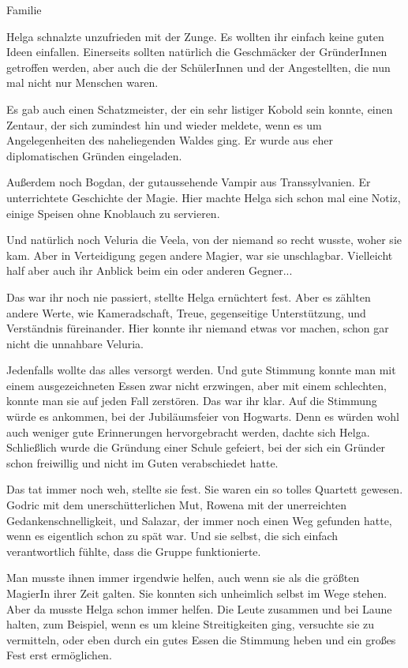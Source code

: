 \documentclass[fontsize=12pt]{scrartcl}
\begin{document}
	{\huge  Familie}
	\vspace{15pt}
	
	{\LARGE H}elga schnalzte unzufrieden mit der Zunge. Es wollten ihr einfach keine guten Ideen einfallen. Einerseits sollten natürlich die Geschmäcker der GründerInnen getroffen werden, aber auch die der SchülerInnen und der Angestellten, die nun mal nicht nur Menschen waren. 
	
	Es gab auch einen Schatzmeister, der ein sehr listiger Kobold sein konnte, einen Zentaur, der sich zumindest hin und wieder meldete, wenn es um Angelegenheiten des naheliegenden Waldes ging. Er wurde aus eher diplomatischen Gründen eingeladen. 
	
	Außerdem noch Bogdan, der gutaussehende Vampir aus Transsylvanien. Er unterrichtete Geschichte der Magie. Hier machte Helga sich schon mal eine Notiz, einige Speisen ohne Knoblauch zu servieren. 
	
	Und natürlich noch Veluria die Veela, von der niemand so recht wusste, woher sie kam. Aber in Verteidigung gegen andere Magier, war sie unschlagbar. Vielleicht half aber auch ihr Anblick beim ein oder anderen Gegner... 
	
	Das war ihr noch nie passiert, stellte Helga ernüchtert fest. Aber es zählten andere Werte, wie Kameradschaft, Treue, gegenseitige Unterstützung, und Verständnis füreinander. Hier konnte ihr niemand etwas vor machen, schon gar nicht die unnahbare Veluria. 
	
	Jedenfalls wollte das alles versorgt werden. Und gute Stimmung konnte man mit einem ausgezeichneten Essen zwar nicht erzwingen, aber mit einem schlechten, konnte man sie auf jeden Fall zerstören. Das war ihr klar. Auf die Stimmung würde es ankommen, bei der Jubiläumsfeier von Hogwarts. Denn es würden wohl auch weniger gute Erinnerungen hervorgebracht werden, dachte sich Helga. Schließlich wurde die Gründung einer Schule gefeiert, bei der sich ein Gründer schon freiwillig und nicht im Guten verabschiedet hatte. 
	
	Das tat immer noch weh, stellte sie fest. Sie waren ein so tolles Quartett gewesen. Godric mit dem unerschütterlichen Mut, Rowena mit der unerreichten Gedankenschnelligkeit, und Salazar, der immer noch einen Weg gefunden hatte, wenn es eigentlich schon zu spät war. Und sie selbst, die sich einfach verantwortlich fühlte, dass die Gruppe funktionierte. 
	
	Man musste ihnen immer irgendwie helfen, auch wenn sie als die größten MagierIn ihrer Zeit galten. Sie konnten sich unheimlich selbst im Wege stehen. Aber da musste Helga schon immer helfen. Die Leute zusammen und bei Laune halten, zum Beispiel, wenn es um kleine Streitigkeiten ging, versuchte sie zu vermitteln, oder eben durch ein gutes Essen die Stimmung heben und ein großes Fest erst ermöglichen. 
	
\end{document}
